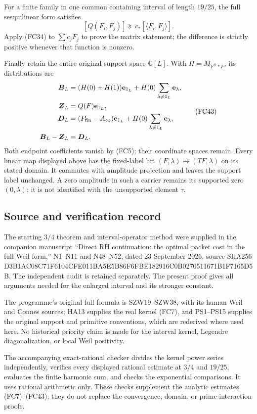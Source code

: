 \documentclass[
  10pt,
  a4paper,
]{article}
\begin{document}
For a finite family in one common containing interval of length
\(19/25\), the full sesquilinear form satisfies \[
[Q(F_i,F_j)]\succeq c_*[\langle F_i,F_j\rangle].
\tag{FC42}
\] Apply (FC34) to \(\sum c_jF_j\) to prove the matrix statement; the
difference is strictly positive whenever that function is nonzero.

Finally retain the entire original support space \(\mathbb C[L]\). With
\(H=M_{F^\#*F}\), its distributions are \[
\begin{aligned}
\boldsymbol B_L&=(H(0)+H(1))\mathbf e_{1_L}
+H(0)\sum_{\lambda\ne1_L}\mathbf e_\lambda,\\
\boldsymbol Z_L&=Q(F)\mathbf e_{1_L},\\
\boldsymbol D_L&=(P_{\rm fin}-A_\infty)\mathbf e_{1_L}
+H(0)\sum_{\lambda\ne1_L}\mathbf e_\lambda,\\
\boldsymbol B_L-\boldsymbol Z_L&=\boldsymbol D_L.
\end{aligned}
\tag{FC43}
\] Both endpoint coefficients vanish by (FC5); their coordinate spaces
remain. Every linear map displayed above has the fixed-label lift
\((F,\lambda)\mapsto(TF,\lambda)\) on its stated domain. It commutes
with amplitude projection and leaves the support label unchanged. A zero
amplitude in such a carrier remains its supported zero \((0,\lambda)\);
it is not identified with the unsupported element \(\tau\).

\subsection{Source and verification
record}\label{source-and-verification-record}

The starting \(3/4\) theorem and interval-operator method were supplied
in the companion manuscript ``Direct RH continuation: the optimal packet
cost in the full Weil form,'' N1--N11 and N48--N52, dated 23 September
2026, source SHA256
D3B1AC08C71F6104CFE011BA5E5B86F6FBE182916C0B0270511671B1F7165D5B. The
independent audit is retained separately. The present proof gives all
arguments needed for the enlarged interval and its stronger constant.

The programme's original full formula is SZW19--SZW38, with its human
Weil and Connes sources; HA13 supplies the real kernel (FC7), and
PS1--PS15 supplies the original support and primitive conventions, which
are rederived where used here. No historical priority claim is made for
the interval kernel, Legendre diagonalization, or local Weil positivity.

The accompanying exact-rational checker divides the kernel power series
independently, verifies every displayed rational estimate at \(3/4\) and
\(19/25\), evaluates the finite harmonic sum, and checks the exponential
comparisons. It uses rational arithmetic only. These checks supplement
the analytic estimates (FC7)--(FC43); they do not replace the
convergence, domain, or prime-interaction proofs.
\end{document}
